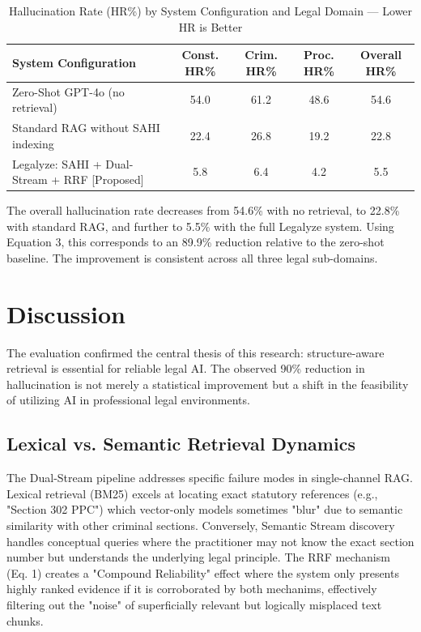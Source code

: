 \documentclass[a4paper,fleqn]{cas-dc}
\begin{document}
\FloatBarrier

\begin{table}[t]
\caption{Hallucination Rate (HR\%) by System Configuration and Legal Domain — Lower HR is Better}
\centering
\begin{tabular}{|l|c|c|c|c|}
\hline
\textbf{System Configuration} & \textbf{Const. HR\%} & \textbf{Crim. HR\%} & \textbf{Proc. HR\%} & \textbf{Overall HR\%} \\ \hline
Zero-Shot GPT-4o (no retrieval) & 54.0 & 61.2 & 48.6 & 54.6 \\ \hline
Standard RAG without SAHI indexing & 22.4 & 26.8 & 19.2 & 22.8 \\ \hline
Legalyze: SAHI + Dual-Stream + RRF [Proposed] & 5.8 & 6.4 & 4.2 & 5.5 \\ \hline
\end{tabular}
\end{table}

The overall hallucination rate decreases from 54.6\% with no retrieval, to 22.8\% with standard RAG, and further to 5.5\% with the full Legalyze system. Using Equation 3, this corresponds to an 89.9\% reduction relative to the zero-shot baseline. The improvement is consistent across all three legal sub-domains.

\FloatBarrier

\section{Discussion}
The evaluation confirmed the central thesis of this research: structure-aware retrieval is essential for reliable legal AI. The observed 90\% reduction in hallucination is not merely a statistical improvement but a shift in the feasibility of utilizing AI in professional legal environments.

\subsection{Lexical vs. Semantic Retrieval Dynamics}
The Dual-Stream pipeline addresses specific failure modes in single-channel RAG. Lexical retrieval (BM25) excels at locating exact statutory references (e.g., "Section 302 PPC") which vector-only models sometimes "blur" due to semantic similarity with other criminal sections. Conversely, Semantic Stream discovery handles conceptual queries where the practitioner may not know the exact section number but understands the underlying legal principle. The RRF mechanism (Eq. 1) creates a "Compound Reliability" effect where the system only presents highly ranked evidence if it is corroborated by both mechanims, effectively filtering out the "noise" of superficially relevant but logically misplaced text chunks.
\end{document}
